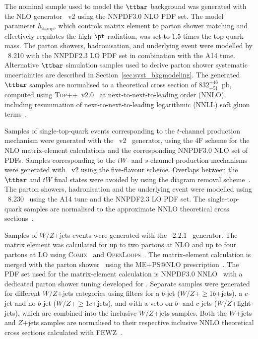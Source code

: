 \documentclass[PAPER, coverpage, atlasdraft=true, texlive=2016, UKenglish]{\ATLASLATEXPATH atlasdoc}
\begin{document}
The nominal sample used to model the $\ttbar$ background was generated with the NLO generator {\powheg}~v2
using the NNPDF3.0 NLO PDF set. The {\powheg} model parameter $h_{\textrm{damp}}$, which controls 
matrix element to parton shower matching and effectively regulates the high-$\pt$ radiation, was set to 1.5 times the top-quark mass. 
The parton showers, hadronisation, and underlying event were modelled by {\pythia}~8.210 with the NNPDF2.3 LO PDF set in combination with the A14 tune.
Alternative $\ttbar$ simulation samples used to derive parton shower systematic uncertainties are described in Section~\ref{sec:syst_bkgmodeling}. 
The generated $\ttbar$ samples are normalised to a theoretical cross section of $832^{+46}_{-51}$~pb, 
computed using \textsc{Top++}~v2.0~\cite{Czakon:2011xx} at next-to-next-to-leading order (NNLO), 
including resummation of next-to-next-to-leading logarithmic (NNLL) soft gluon 
terms~\cite{Cacciari:2011hy,Baernreuther:2012ws,Czakon:2012zr,Czakon:2012pz,Czakon:2013goa}.

Samples of single-top-quark events corresponding to the $t$-channel production mechanism were generated with the 
{\powheg}~v2~\cite{Frederix:2012dh} generator, using the 4F scheme  for the NLO matrix-element calculations
and the corresponding NNPDF3.0 NLO set of PDFs.
Samples corresponding to the $tW$- and $s$-channel production mechanisms were generated 
with {\powheg}~v2 using the five-flavour scheme. Overlaps between the $\ttbar$ and $tW$ final states were avoided by using 
the diagram removal scheme~\cite{Frixione:2005vw}.
The parton showers, hadronisation and the underlying event were modelled using {\pythia}~8.230~\cite{Sjostrand:2006za} using the A14 tune and the NNPDF2.3 LO PDF set.
The single-top-quark samples are normalised to the approximate NNLO theoretical cross 
sections~\cite{Kidonakis:2011wy,Kidonakis:2010ux,Kidonakis:2010tc}. 

Samples of $W/Z$+jets events were generated with the {\sherpa}~2.2.1~\cite{Gleisberg:2008ta} generator. 
The matrix element was calculated for up to two partons at NLO and up to four partons at LO using 
\textsc{Comix}~\cite{Gleisberg:2008fv} and \textsc{OpenLoops}~\cite{Cascioli:2011va}. The matrix-element calculation 
is merged with the {\sherpa} parton shower~\cite{Schumann:2007mg} using the ME+PS@NLO prescription~\cite{Hoeche:2012yf}. 
The PDF set used for the matrix-element calculation is NNPDF3.0 NNLO~\cite{Ball:2014uwa} with a dedicated parton shower tuning developed for {\sherpa}. 
Separate samples were generated for different $W/Z$+jets categories using filters for a $b$-jet 
($W/Z$+$\geq$1$b$+jets), a $c$-jet and no $b$-jet ($W/Z$+$\geq$1$c$+jets), and with a veto on $b$- and $c$-jets 
($W/Z$+light-jets), which are combined into the inclusive $W/Z$+jets samples.
Both the $W$+jets and $Z$+jets samples are normalised to their respective inclusive NNLO theoretical 
cross sections calculated with \textsc{FEWZ}~\cite{Anastasiou:2003ds}.
\end{document}
